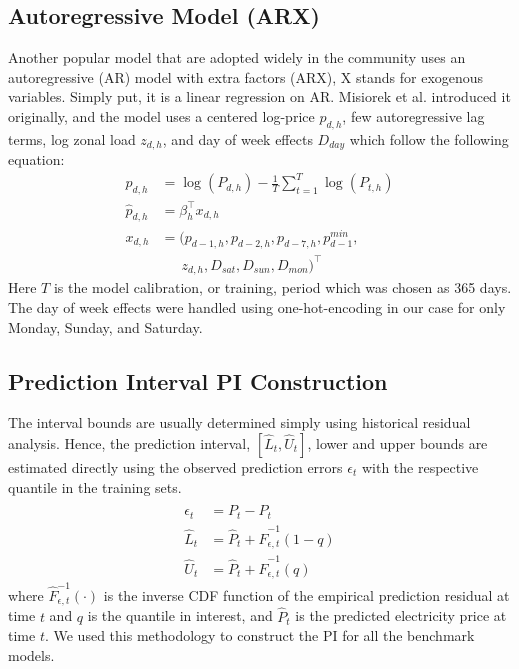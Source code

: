 \documentclass[11pt, letterpaper, journal]{IEEEtran}
\begin{document}
\subsection{Autoregressive Model (ARX)}
Another popular model that are adopted widely in the community uses an autoregressive (AR) model with extra factors (ARX), X stands for exogenous variables. Simply put, it is a linear regression on AR. Misiorek et al. introduced it originally, and the model uses a centered log-price $p_{d,h}$, few autoregressive lag terms, log zonal load $z_{d,h}$, and day of week effects $D_{day}$ which follow the following equation:
\begin{align*}
    p_{d,h} &= \log(P_{d,h}) - \frac{1}{T}\sum_{t=1}^{T} \log(P_{t, h}) \\
    \hat{p}_{d,h} &= \beta_h^{\intercal} x_{d,h} \\
    x_{d, h} &= (p_{d-1,h}, p_{d-2,h}, p_{d-7,h}, p_{d-1}^{min}, \\
             &\quad \,\,\, z_{d,h}, D_{sat}, D_{sun}, D_{mon})^{\intercal}
\end{align*}
Here $T$ is the model calibration, or training, period which was chosen as 365 days. The day of week effects were handled using one-hot-encoding in our case for only Monday, Sunday, and Saturday.

\subsection{Prediction Interval {PI} Construction}
The interval bounds are usually determined simply using historical residual analysis. Hence, the prediction interval, $[\hat{L}_t, \hat{U}_t]$, lower and upper bounds are estimated directly using the observed prediction errors $\epsilon_t$ with the respective quantile in the training sets. 
\begin{align*}
    \epsilon_t &= P_t - \hat{P}_t \\
    \hat{L}_t &= \hat{P}_t + \hat{F}^{-1}_{\epsilon, t}(1-q) \\
    \hat{U}_t &= \hat{P}_t + \hat{F}^{-1}_{\epsilon, t}(q)
\end{align*}
where $\hat{F}^{-1}_{\epsilon, t}(\cdot)$ is the inverse CDF function of the empirical prediction residual at time $t$ and $q$ is the quantile in interest, and $\hat{P}_t$ is the predicted electricity price at time $t$. We used this methodology to construct the PI for all the benchmark models.
\end{document}
